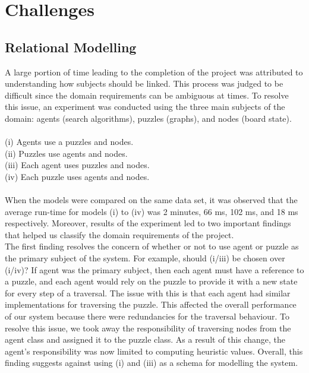 \section{Challenges}

\subsection{Relational Modelling}

A large portion of time leading to the completion of the project was attributed to understanding how subjects should be linked. This process was judged to be difficult since the domain requirements can be ambiguous at times. To resolve this issue, an experiment was conducted using the three main subjects of the domain: agents (search algorithms), puzzles (graphs), and nodes (board state).
\\
\\

(i) Agents use a puzzles and nodes. 
\\

(ii) Puzzles use agents and nodes.
\\

(iii) Each agent uses puzzles and nodes.
\\

(iv) Each puzzle uses agents and nodes.
\\
\\

When the models were compared on the same data set, it was observed that the average run-time for models (i) to (iv) was 2 minutes, 66 ms, 102 ms, and 18 ms respectively.  Moreover, results of the experiment led to two important findings that helped us classify the domain requirements of the project.\\

The first finding resolves the concern of whether or not to use agent or puzzle as the primary subject of the system. For example, should (i/iii) be chosen over (i/iv)? If agent was the primary subject, then each agent must have a reference to a puzzle, and each agent would rely on the puzzle to provide it with a new state for every step of a traversal. The issue with this is that each agent had similar implementations for traversing the puzzle. This affected the overall performance of our system because there were redundancies for the traversal behaviour. To resolve this issue, we took away the responsibility of traversing nodes from the agent class and assigned it to the puzzle class. As a result of this change, the agent's responsibility was now limited to computing heuristic values. Overall, this finding suggests against using (i) and (iii) as a schema for modelling the system.\\

